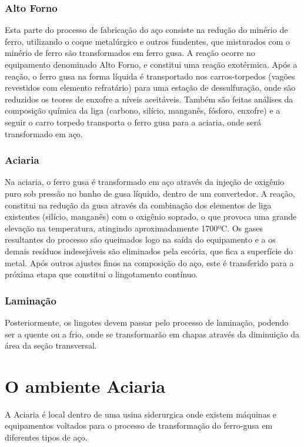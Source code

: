 \subsubsection{Alto Forno}
Esta parte do processo de fabricação do aço consiste na redução do minério de ferro, utilizando o coque metalúrgico e outros fundentes, que misturados com o minério de ferro são transformados em ferro gusa. A reação ocorre no equipamento denominado Alto Forno, e constitui uma reação exotérmica. Após a reação, o ferro gusa na forma líquida é transportado nos carros-torpedos (vagões revestidos com elemento refratário) para uma estação de dessulfuração, onde são reduzidos os teores de enxofre a níveis aceitáveis. Também são feitas análises da composição química da liga (carbono, silício, manganês, fósforo, enxofre) e a seguir o carro torpedo transporta o ferro gusa para a aciaria, onde será transformado em aço.

\subsubsection{Aciaria}
Na aciaria, o ferro gusa é transformado em aço através da injeção de oxigênio puro sob pressão no banho de gusa líquido, dentro de um convertedor. A reação, constitui na redução da gusa através da combinação dos elementos de liga existentes (silício, manganês) com o oxigênio soprado, o que provoca uma grande elevação na temperatura, atingindo aproximadamente 1700ºC.
Os gases resultantes do processo são queimados logo na saída do equipamento e a os demais resíduos indesejáveis são eliminados pela escória, que fica a superfície do metal.
Após outros ajustes finos na composição do aço, este é transferido para a próxima etapa que constitui o lingotamento contínuo. 

\subsubsection{Laminação}
Posteriormente, os lingotes devem passar pelo processo de laminação, podendo ser a quente ou a frio, onde se transformarão em chapas através da diminuição da área da seção transversal.


\section{O ambiente Aciaria}
A Aciaria é local dentro de uma usina siderurgica onde existem máquinas e equipamentos voltados para o processo de transformação do ferro-gusa em diferentes tipos de aço. \cite{IBS}

